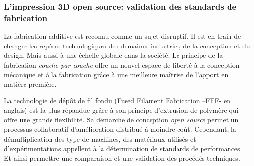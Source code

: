 \documentclass[
  11pt,
]{article}
\begin{document}
\hypertarget{limpression-3d-open-source-validation-des-standards-de-fabrication}{%
\subsubsection{L'impression 3D open source: validation des standards de
fabrication}\label{limpression-3d-open-source-validation-des-standards-de-fabrication}}

La fabrication additive est reconnu comme un sujet disruptif. Il est en
train de changer les repères technologiques des domaines industriel, de
la conception et du design. Mais aussi à une échelle globale dans la
société. Le principe de la fabrication \emph{couche-par-couche} offre un
nouvel espace de liberté à la conception mécanique et à la fabrication
grâce à une meilleure maîtrise de l'apport en matière première.

La technologie de dépôt de fil fondu (Fused Filament Fabrication --FFF-
en anglais) est la plus répandue grâce à son principe d'extrusion de
polymère qui offre une grande flexibilité. Sa démarche de conception
\emph{open source} permet un processus collaboratif d'amélioration
distribué à moindre coût. Cependant, la démultiplication des type de
machines, des matériaux utilisés et d'expérimentations appellent à la
détermination de standards de performances. Et ainsi permettre une
comparaison et une validation des procédés techniques.
\end{document}
